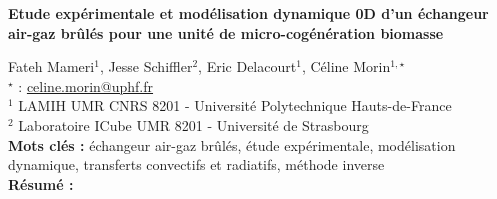 


    \newpage

\BgThispage

%
\begin{flushleft}
\addtocounter{section}{1}
{\Large \textbf{Etude expérimentale et modélisation dynamique 0D d'un échangeur air-gaz brûlés pour une unité de micro-cogénération biomasse}}\label{ref:64}
\end{flushleft}
%
Fateh Mameri$^{1}$, Jesse Schiffler$^{2}$, Eric Delacourt$^{1}$, Céline Morin$^{1,\star}$\\[2mm]
$^{\star}$ \Letter : \url{celine.morin@uphf.fr}\\[2mm]
{\footnotesize $^{1}$ LAMIH UMR CNRS 8201 - Université Polytechnique Hauts-de-France}\\
{\footnotesize $^{2}$ Laboratoire ICube UMR 8201 - Université de Strasbourg}\\
[4mm]
%
\noindent \textbf{Mots clés : } échangeur air-gaz brûlés, étude expérimentale, modélisation dynamique, transferts convectifs et radiatifs, méthode inverse\\[4mm]
%
\noindent \textbf{Résumé : } 

